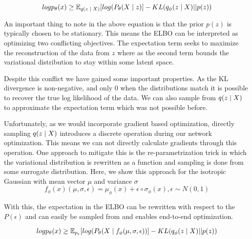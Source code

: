 \begin{equation}
	log p_{\theta}(x) \geq \operatorname{\mathbb{E}}_{q(z \; | \;{X})} [ log(P_{\theta}(X \; | \;{z}) ]  - KL(q_{\phi}(z \; | \;{X}) || p(z))
\end{equation}

An important thing to note in the above equation is that the prior $p(z)$ is typically chosen to be stationary. This means the \ac{ELBO} can be interpreted as optimizing two conflicting objectives. The expectation term seeks to maximize the reconstruction of the data from $z$ where as the second term bounds the variational distribution to stay within some latent space.

Despite this conflict we have gained some important properties. As the KL divergence is non-negative, and only 0 when the distributions match it is possible to recover the true log likelihood of the data. We can also sample from $q(z \; | \;{X})$ to approximate the expectation term which was not possible before.

Unfortunately, as we would incorporate gradient based optimization, directly sampling $q(z \; | \;{X})$ introduces a discrete operation during our network optimization. This means we can not directly calculate gradients through this operation. One approach to mitigate this is the re-parametrization trick \cite{kingma2014autoencodingVB,rezende2014stochasticBackprop} in which the variational distribution  is rewritten as a function and sampling is done from some surrogate distribution. Here, we show this approach for the isotropic Gaussian with mean vector $\mu$ and variance $\sigma$
\begin{equation}
f_{\phi}(x)(\mu, \sigma, \epsilon) = \mu_{\phi}(x) + \epsilon \circ \sigma_{\phi}(x), \epsilon \sim N(0, 1)
\end{equation}

With this, the expectation in the \ac{ELBO} can be rewritten with respect to the $P(\epsilon)$ and can easily be sampled from and enables end-to-end optimization. 

\begin{equation}
log p_{\theta}(x) \geq \operatorname{\mathbb{E}}_{p_{\epsilon} } [ log(P_{\theta}(X \; | \;{f_{\phi}(\mu, \sigma, \epsilon)}) ]  - KL(q_{\phi}(z \; | \;{X}) || p(z))
\end{equation}






